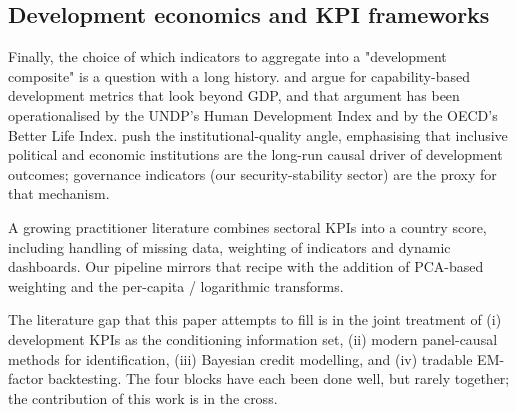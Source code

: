 \subsection{Development economics and KPI frameworks}

Finally, the choice of which indicators to aggregate into a "development composite" is a question with a long history. \textcite{sen1999} and \textcite{nussbaum2011} argue for capability-based development metrics that look beyond GDP, and that argument has been operationalised by the UNDP's Human Development Index and by the OECD's Better Life Index. \textcite{acemoglurobinson2012} push the institutional-quality angle, emphasising that inclusive political and economic institutions are the long-run causal driver of development outcomes; governance indicators (our security-stability sector) are the proxy for that mechanism.

A growing practitioner literature combines sectoral KPIs into a country score, including handling of missing data, weighting of indicators and dynamic dashboards. Our pipeline mirrors that recipe with the addition of PCA-based weighting and the per-capita / logarithmic transforms.

The literature gap that this paper attempts to fill is in the joint treatment of (i) development KPIs as the conditioning information set, (ii) modern panel-causal methods for identification, (iii) Bayesian credit modelling, and (iv) tradable EM-factor backtesting. The four blocks have each been done well, but rarely together; the contribution of this work is in the cross.
